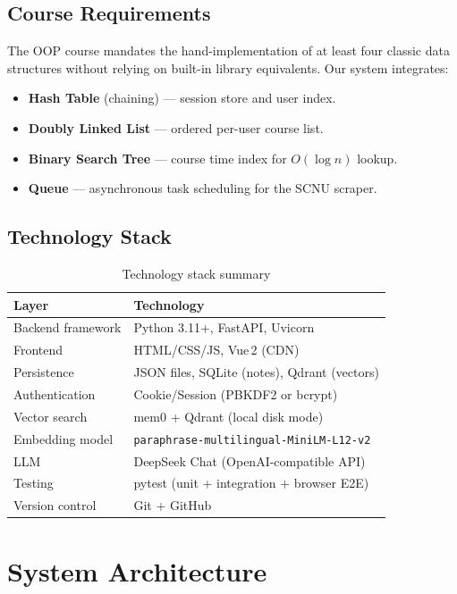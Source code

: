 \documentclass[12pt,a4paper]{article}
\begin{document}
\subsection{Course Requirements}

The OOP course mandates the hand-implementation of at least four classic data structures without relying on built-in library equivalents. Our system integrates:
\begin{itemize}[nosep]
    \item \textbf{Hash Table} (chaining) --- session store and user index.
    \item \textbf{Doubly Linked List} --- ordered per-user course list.
    \item \textbf{Binary Search Tree} --- course time index for $O(\log n)$ lookup.
    \item \textbf{Queue} --- asynchronous task scheduling for the SCNU scraper.
\end{itemize}

\subsection{Technology Stack}

\begin{table}[H]
\centering
\caption{Technology stack summary}
\begin{tabular}{@{}ll@{}}
\toprule
\textbf{Layer} & \textbf{Technology} \\
\midrule
Backend framework & Python 3.11+, FastAPI, Uvicorn \\
Frontend & HTML/CSS/JS, Vue\,2 (CDN) \\
Persistence & JSON files, SQLite (notes), Qdrant (vectors) \\
Authentication & Cookie/Session (PBKDF2 or bcrypt) \\
Vector search & mem0 + Qdrant (local disk mode) \\
Embedding model & \texttt{paraphrase-multilingual-MiniLM-L12-v2} \\
LLM & DeepSeek Chat (OpenAI-compatible API) \\
Testing & pytest (unit + integration + browser E2E) \\
Version control & Git + GitHub \\
\bottomrule
\end{tabular}
\end{table}

\section{System Architecture}
\label{sec:arch}
\end{document}
